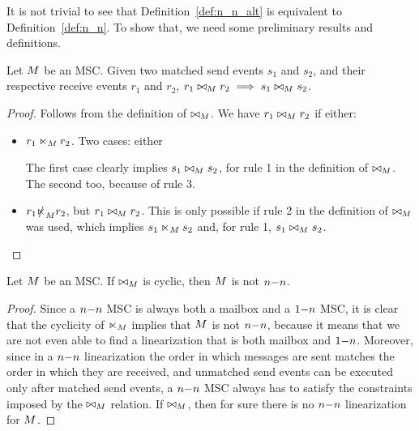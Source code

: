 \documentclass{article}
\begin{document}
It is not trivial to see that Definition~\ref{def:n_n_alt} is equivalent to Definition~\ref{def:n_n}. To show that, we need some preliminary results and definitions. 

\begin{proposition}
	Let $M$ be an MSC. Given two matched send events $s_1$ and $s_2$, and their respective receive events $r_1$ and $r_2$, $r_1 \bowtie_M r_2 \implies s_1 \bowtie_M s_2$.
\end{proposition}
\begin{proof}
Follows from the definition of $\bowtie_M$. We have $r_1 \bowtie_M r_2$ if either:
\begin{itemize}\itemsep=0.5ex
	\item $r_1 \ltimes_M r_2$. Two cases: either \begin{enumerate*}[label={(\roman*)}]
		\item $s_1 \nnrel_\msc s_2$, or 
		\item $s_1 \slashed{\nnrel}_\msc s_2$.
	\end{enumerate*}
	The first case clearly implies $s_1 \bowtie_M s_2$, for rule 1 in the definition of $\bowtie_M$. The second too, because of rule 3.
	\item  $r_1 \slashed{\ltimes}_M r_2$, but $r_1 \bowtie_M r_2$. This is only possible if rule 2 in the definition of $\bowtie_M$ was used, which implies $s_1 \nnrel_\msc s_2$ and, for rule 1, $s_1 \bowtie_M s_2$.
\end{itemize}
\end{proof}

\begin{proposition}\label{prop:n_n_cycl}
	Let $M$ be an MSC. If $\bowtie_M$ is cyclic, then $M$ is not $n\mathsf{-}n$.
\end{proposition}
\begin{proof}
Since a $n\mathsf{-}n$ MSC is always both a mailbox and a $1\mathsf{-}n$ MSC, it is clear that the cyclicity of $\ltimes_M$ implies that $M$ is not $n\mathsf{-}n$, because it means that we are not even able to find a linearization that is both mailbox and $1\mathsf{-}n$. Moreover, since in a $n\mathsf{-}n$ linearization the order in which messages are sent matches the order in which they are received, and unmatched send events can be executed only after matched send events, a $n\mathsf{-}n$ MSC always has to satisfy the constraints imposed by the $\bowtie_M$ relation. If $\bowtie_M$, then for sure there is no $n\mathsf{-}n$ linearization for $M$.
\end{proof}
\end{document}

